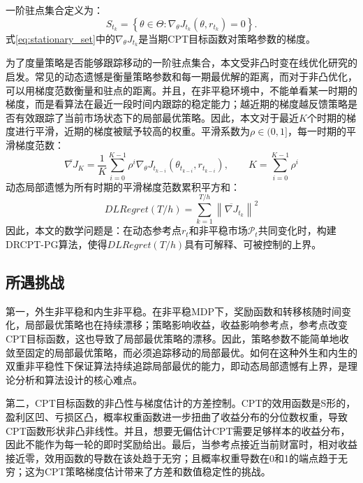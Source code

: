 \documentclass{sufethesismas}
\begin{document}
一阶驻点集合定义为：
\begin{equation}
\label{eq:stationary_set}
S_{t_k}
=
\left\{
\theta\in\Theta:
\nabla_\theta J_{t_k}(\theta,r_{t_k})=0
\right\}.
\end{equation}
式\eqref{eq:stationary_set}中的$\nabla_\theta J_{t_k}$是当期CPT目标函数对策略参数的梯度。

为了度量策略是否能够跟踪移动的一阶驻点集合，本文受非凸时变在线优化研究的启发\citep{hazan2017efficient,aydore2019dynamic}。常见的动态遗憾是衡量策略参数和每一期最优解的距离，而对于非凸优化，可以用梯度范数衡量和驻点的距离。并且，在非平稳环境中，不能单看某一时期的梯度，而是看算法在最近一段时间内跟踪的稳定能力；越近期的梯度越反馈策略是否有效跟踪了当前市场状态下的局部最优策略。因此，本文对于最近$K$个时期的梯度进行平滑，近期的梯度被赋予较高的权重。平滑系数为$\rho\in(0,1]$，每一时期的平滑梯度范数：
\begin{equation}
\label{eq:smoothed_gradient}
\overline{\nabla J}_K
=\frac{1}{K}
\sum_{i=0}^{K-1}
\rho^i
\nabla_\theta J_{t_{k-i}}(\theta_{t_{k-i}},r_{t_{k-i}}),
\qquad
K=
\sum_{i=0}^{K-1}\rho^i
\end{equation}
动态局部遗憾为所有时期的平滑梯度范数累积平方和：
\begin{equation}
\label{eq:dynamic_local_regret}
DLRegret(T/h)
=
\sum_{k=1}^{T/h}
\left\|
\overline{\nabla J}_{t_k}
\right\|^2
\end{equation}
因此，本文的数学问题是：在动态参考点$r_t$和非平稳市场$\mathcal{P}_t$共同变化时，构建DRCPT-PG算法，使得$DLRegret(T/h)$具有可解释、可被控制的上界。
\subsection{所遇挑战}

第一，外生非平稳和内生非平稳。在非平稳MDP下，奖励函数和转移核随时间变化，局部最优策略也在持续漂移；策略影响收益，收益影响参考点，参考点改变CPT目标函数，这也导致了局部最优策略的漂移。因此，策略参数不能简单地收敛至固定的局部最优策略，而必须追踪移动的局部最优。如何在这种外生和内生的双重非平稳性下保证算法持续追踪局部最优的能力，即动态局部遗憾有上界，是理论分析和算法设计的核心难点。

第二，CPT目标函数的非凸性与梯度估计的方差控制。CPT的效用函数是S形的，盈利区凹、亏损区凸，概率权重函数进一步扭曲了收益分布的分位数权重，导致CPT函数形状非凸非线性。并且，想要无偏估计CPT需要足够样本的收益分布，因此不能作为每一轮的即时奖励给出。最后，当参考点接近当前财富时，相对收益接近零，效用函数的导数在该处趋于无穷；且概率权重导数在0和1的端点趋于无穷；这为CPT策略梯度估计带来了方差和数值稳定性的挑战。
\end{document}
